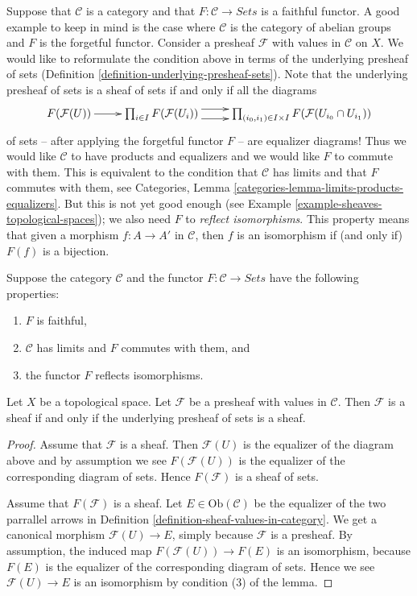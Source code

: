 \noindent
Suppose that $\mathcal{C}$ is a category and that
$F : \mathcal{C} \to \textit{Sets}$ is a faithful functor.
A good example to keep in mind is the case where $\mathcal{C}$
is the category of abelian groups and $F$ is the forgetful functor.
Consider a presheaf $\mathcal{F}$ with values in $\mathcal{C}$ on $X$.
We would like to reformulate the condition above in terms
of the underlying presheaf of sets
(Definition \ref{definition-underlying-presheaf-sets}).
Note that the underlying
presheaf of sets is a sheaf of sets if and only if all the
diagrams
$$
\xymatrix{
F(\mathcal{F}(U)) \ar[r]
&
\prod\nolimits_{i\in I}
F(\mathcal{F}(U_i))
\ar@<1ex>[r] \ar@<-1ex>[r]
&
\prod\nolimits_{(i_0, i_1) \in I\times I}
F(\mathcal{F}(U_{i_0} \cap U_{i_1}))
}
$$
of sets -- after applying the forgetful functor $F$ -- are
equalizer diagrams! Thus we would like $\mathcal{C}$ to have
products and equalizers and we would like $F$ to commute with
them. This is equivalent to the condition that $\mathcal{C}$
has limits and that $F$ commutes with them, see 
Categories, Lemma \ref{categories-lemma-limits-products-equalizers}.
But this is not yet good enough
(see Example \ref{example-sheaves-topological-spaces});
we also need $F$ to {\it reflect isomorphisms}.
This property means that given a morphism
$f : A \to A'$ in $\mathcal{C}$, then $f$ is
an isomorphism if (and only if) $F(f)$ is a bijection.

\begin{lemma}
\label{lemma-sheaves-structure}
Suppose the category $\mathcal{C}$ and
the functor $F : \mathcal{C} \to \textit{Sets}$
have the following properties:
\begin{enumerate}
\item $F$ is faithful,
\item $\mathcal{C}$ has limits and $F$ commutes with them, and
\item the functor $F$ reflects isomorphisms.
\end{enumerate}
Let $X$ be a topological space. Let $\mathcal{F}$
be a presheaf with values in $\mathcal{C}$.
Then $\mathcal{F}$ is a sheaf if and only if the
underlying presheaf of sets is a sheaf.
\end{lemma}

\begin{proof}
Assume that $\mathcal{F}$ is a sheaf. Then
$\mathcal{F}(U)$ is the equalizer of the diagram
above and by assumption we see $F(\mathcal{F}(U))$
is the equalizer of the corresponding diagram
of sets. Hence $F(\mathcal{F})$ is a sheaf of sets.

\medskip\noindent
Assume that $F(\mathcal{F})$ is a sheaf.
Let $E \in \text{Ob}(\mathcal{C})$ be the
equalizer of the two parrallel arrows in 
Definition \ref{definition-sheaf-values-in-category}.
We get a canonical morphism $\mathcal{F}(U) \to E$,
simply because $\mathcal{F}$ is a presheaf.
By assumption, the induced map $F(\mathcal{F}(U)) \to F(E)$
is an isomorphism, because $F(E)$ is the equalizer
of the corresponding diagram of sets. Hence we
see $\mathcal{F}(U) \to E$ is an isomorphism
by condition (3) of the lemma.
\end{proof}

